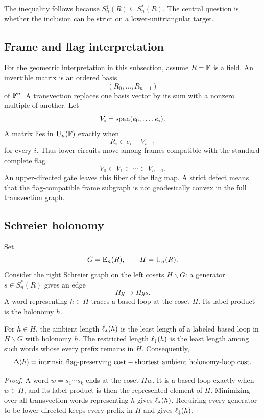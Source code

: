 The inequality follows because $S_n^\downarrow(R)\subseteq S_n^*(R)$.  The central question is whether the inclusion can be strict on a lower-unitriangular target.

\subsection{Frame and flag interpretation}

For the geometric interpretation in this subsection, assume $R=\mathbb F$ is a field.  An invertible matrix is an ordered basis
\[
(R_0,\ldots,R_{n-1})
\]
of $\mathbb F^n$.  A transvection replaces one basis vector by its sum with a nonzero multiple of another.  Let
\[
V_i=\operatorname{span}(e_0,\ldots,e_i).
\]
A matrix lies in $\operatorname{U}_n(\mathbb F)$ exactly when
\[
R_i\in e_i+V_{i-1}
\]
for every $i$.  Thus lower circuits move among frames compatible with the standard complete flag
\[
V_0\subset V_1\subset\cdots\subset V_{n-1}.
\]
An upper-directed gate leaves this fiber of the flag map.  A strict defect means that the flag-compatible frame subgraph is not geodesically convex in the full transvection graph.

\subsection{Schreier holonomy}

Set
\[
G=\operatorname{E}_n(R),
\qquad
H=\operatorname{U}_n(R).
\]
Consider the right Schreier graph on the left cosets $H\backslash G$: a generator $s\in S_n^*(R)$ gives an edge
\[
Hg\longrightarrow Hgs.
\]
A word representing $h\in H$ traces a based loop at the coset $H$.  Its label product is the holonomy $h$.

\begin{proposition}\label{prop:schreier-holonomy}
For $h\in H$, the ambient length $\ell_{*}(h)$ is the least length of a labeled based loop in $H\backslash G$ with holonomy $h$.  The restricted length $\ell_{\downarrow}(h)$ is the least length among such words whose every prefix remains in $H$.  Consequently,
\[
\Delta(h)
=
\text{intrinsic flag-preserving cost}
-
\text{shortest ambient holonomy-loop cost}.
\]
\end{proposition}

\begin{proof}
A word $w=s_1\cdots s_k$ ends at the coset $Hw$.  It is a based loop exactly when $w\in H$, and its label product is then the represented element of $H$.  Minimizing over all transvection words representing $h$ gives $\ell_{*}(h)$.  Requiring every generator to be lower directed keeps every prefix in $H$ and gives $\ell_{\downarrow}(h)$.
\end{proof}

